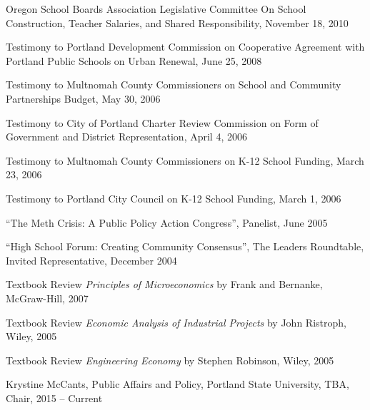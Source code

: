\documentclass[Computer Science]{vita}
\begin{document}
\begin{vita}
\begin{Community Outreach}
\item Oregon School Boards Association Legislative Committee On School Construction, Teacher Salaries, and Shared Responsibility, November 18, 2010   

  \item Testimony to Portland Development Commission on Cooperative
    Agreement with Portland Public Schools on Urban Renewal, June 25,
    2008

  \item Testimony to Multnomah County Commissioners on School and
    Community Partnerships Budget, May 30, 2006

  \item Testimony to City of Portland Charter Review Commission on
    Form of Government and District Representation, April 4, 2006

  \item Testimony to Multnomah County Commissioners on K-12 School
    Funding, March 23, 2006

  \item Testimony to Portland City Council on K-12 School Funding,
    March 1, 2006

  \item ``The Meth Crisis: A Public Policy Action Congress'',
    Panelist, June 2005

  \item ``High School Forum: Creating Community Consensus'', The
    Leaders Roundtable, Invited Representative, December 2004
  \end{Community Outreach}

  \begin{Instructional Activities}

    \begin{Reviews}
    \item Textbook Review \emph{Principles of Microeconomics} by
      Frank and Bernanke, McGraw-Hill, 2007

    \item Textbook Review \emph{Economic Analysis of Industrial
        Projects} by John Ristroph, Wiley, 2005

    \item Textbook Review \emph{Engineering Economy} by Stephen
      Robinson, Wiley, 2005
    \end{Reviews}

    \begin{Ph.D. Thesis Committee}
    
      
    \item Krystine McCants, Public Affairs and Policy, Portland State University, TBA, Chair, 2015 -- Current
    

\end{Ph.D. Thesis Committee}
\end{Instructional Activities}
\end{vita}
\end{document}
